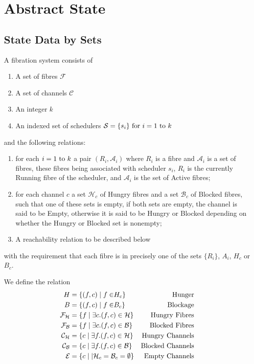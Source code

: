 \documentclass[oneside]{book}
\begin{document}
\section{Abstract State}
\subsection{State Data by Sets}
A fibration system consists of 
\begin{enumerate}
\item A set of fibres $\mathcal F$
\item A set of channels $\mathcal C$
\item An integer $k$
\item An indexed set of schedulers $\mathcal S= \{s_i\}{\rm\ for\ }i=1 {\rm\ to\ }k$  
\end{enumerate}
and the following relations:
\begin{enumerate}
\item for each $i=1 {\rm\ to\ }k$ a pair $(R_i, \mathcal A_i)$ where $R_i$ is a fibre
and $\mathcal A_i$ is a set of fibres, these fibres being associated with
scheduler $s_i$, $R_i$ is the currently Running fibre of the scheduler,
and $\mathcal A_i$ is the set of Active fibres;
\item for each channel $c$ a set $\mathcal H_c$ of Hungry fibres
and a set $\mathcal B_c$ of Blocked fibres, such that one of these sets
is empty, if both sets are empty, the channel is said to be Empty,
otherwise it is said to be Hungry or Blocked depending on whether
the Hungry or Blocked set is nonempty;

\item A reachability relation to be described below
\end{enumerate}
with the requirement that each fibre is in precisely one of the sets $\{R_i\}$,
$A_i$, $H_c$ or $B_c$.

We define the relation 
\begin{align}
\mathrel H &= \{(f,c) \mid f \in \mathrel H_c\}&\rm Hunger\\
\mathrel B &= \{(f,c) \mid f \in \mathrel B_c\}&\rm Blockage\\
\mathcal F_{\mathcal H} &= \{f \mid \exists c . (f,c) \in \mathcal H\}&\rm Hungry\ Fibres\\
\mathcal F_{\mathcal B} &= \{f \mid \exists c . (f,c) \in \mathcal B\}&\rm Blocked\ Fibres\\
\mathcal C_{\mathcal H} &= \{ c \mid \exists f . (f,c) \in \mathcal H\}&\rm Hungry\ Channels\\
\mathcal C_{\mathcal B} &= \{ c \mid \exists f . (f,c) \in \mathcal B\}&\rm Blocked\ Channels\\
\mathcal E &= \{c \mid | \mathcal H_c = \mathcal B_c = \emptyset \}&\rm Empty\ Channels
\end{align}
\end{document}
